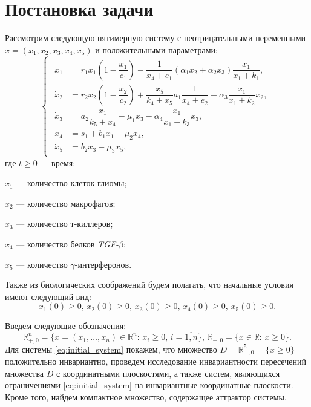 \documentclass[12pt,a4paper]{extarticle}
\theoremstyle{definition}
\theoremstyle{definition}
\theoremstyle{definition}
\begin{document}
	\section{Постановка задачи}
	
	Рассмотрим следующую пятимерную систему с неотрицательными переменными $x=(x_1, x_2, x_3, x_4, x_5)$ и положительными параметрами:
	\begin{equation}
		\begin{cases}
			\begin{aligned}
				\dot{x}_1 &= r_1x_1\left(1-\dfrac{x_1}{c_1}\right)-\dfrac{1}{x_4+e_1}(\alpha_1x_2+\alpha_2x_3)\dfrac{x_1}{x_1+k_1},\\
				\dot{x}_2 &= r_2x_2\left(1-\dfrac{x_2}{c_2}\right)+\dfrac{x_5}{k_4+x_5}a_1\dfrac{1}{x_4+e_2}-\alpha_3\dfrac{x_1}{x_1+k_2}x_2,\\
				\dot{x}_3 &= a_2\dfrac{x_1}{k_5+x_4}-\mu_1x_3-\alpha_4\dfrac{x_1}{x_1+k_3}x_3,\\
				\dot{x}_4 &= s_1 + b_1x_1-\mu_2x_4,\\
				\dot{x}_5 &= b_2x_3-\mu_3x_5,
			\end{aligned}
		\end{cases}\label{eq:initial_system}
	\end{equation}
	где $t\ge0$ --- время;
	
	$x_1$ --- количество клеток глиомы;
	
	$x_2$ --- количество макрофагов;
	
	$x_3$ --- количество т-киллеров;
	
	$x_4$ --- количество белков \textit{TGF-}$\beta$;
	
	$x_5$ --- количество $\gamma$-интерферонов. 
	
	Также из биологических соображений будем полагать, что начальные условия имеют следующий вид:
	\begin{equation}\label{eq:conds}
	x_1(0)\ge0,\,x_2(0)\ge0,\,x_3(0)\ge0,\,x_4(0)\ge0,\,x_5(0)\ge0.
	\end{equation}
	
	Введем следующие обозначения:
	\[\mathbb{R}^n_{+,0}=\{x=(x_1,\dots,x_n)\in\mathbb{R}^n:\, x_i\ge0,\, i=\overline{1,n}\},\,\mathbb{R}_{+,0}=\{x\in\mathbb{R}:\, x\ge0\}.\]
	Для системы \ref{eq:initial_system} покажем, что множество $D=\mathbb{R}^{5}_{+,0} = \{x \ge 0\}$ положительно инвариантно, проведем исследование инвариантности пересечений множества $D$ с координатными плоскостями, а также систем, являющихся ограничениями \ref{eq:initial_system} на инвариантные координатные плоскости. Кроме того, найдем компактное множество, содержащее аттрактор системы.
	
\end{document}
